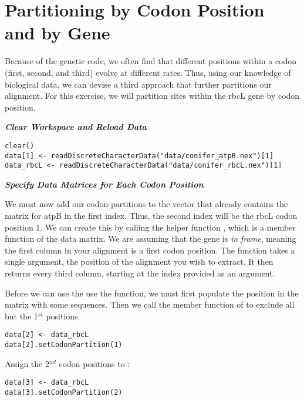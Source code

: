 \bigskip
\section{Partitioning by Codon Position and by Gene}\label{secExtremeP}

Because of the genetic code, we often find that different positions within a codon (first, second, and third) evolve at different rates.
Thus, using our knowledge of biological data, we can devise a third approach that further partitions our alignment. 
For this exercise, we will partition sites within the rbcL gene by codon position.

\textbf{\textit{Clear Workspace and Reload Data}}

{\tt \begin{snugshade*}
\begin{lstlisting}
clear()
data[1] <- readDiscreteCharacterData("data/conifer_atpB.nex")[1]
data_rbcL <- readDiscreteCharacterData("data/conifer_rbcL.nex")[1]
\end{lstlisting}
\end{snugshade*}}

\textbf{\textit{Specify Data Matrices for Each Codon Position}}

We must now add our codon-partitions to the  vector that already contains the matrix for atpB in the first index. 
Thus, the second index will be the rbcL codon position 1. 
We can create this by calling the helper function , which is a member function of the data matrix. 
We are assuming that the gene is \textit{in frame}, meaning the first column in your alignment is a first codon position. 
The  function takes a single argument, the position of the alignment you wish to extract. 
It then returns every third column, starting at the index provided as an argument.

Before we can use the use the  function, we must first populate the position in the  matrix with some sequences. 
Then we call the member function of  to exclude all but the 1$^{st}$ positions.
{\tt \begin{snugshade*}
\begin{lstlisting}
data[2] <- data_rbcL
data[2].setCodonPartition(1)
\end{lstlisting}
\end{snugshade*}}

Assign the 2$^{nd}$ codon positions to :
{\tt \begin{snugshade*}
\begin{lstlisting}
data[3] <- data_rbcL
data[3].setCodonPartition(2)
\end{lstlisting}
\end{snugshade*}}

